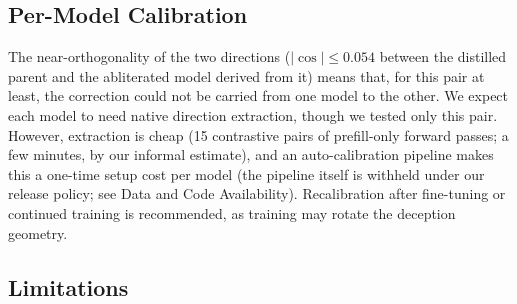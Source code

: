 \documentclass[11pt,letterpaper]{article}
\begin{document}
\subsection{Per-Model Calibration}\label{sec:calibration}

The near-orthogonality of the two directions ($|\cos| \le 0.054$ between the distilled parent and the abliterated model derived from it) means that, for this pair at least, the correction could not be carried from one model to the other. We expect each model to need native direction extraction, though we tested only this pair. However, extraction is cheap (15 contrastive pairs of prefill-only forward passes; a few minutes, by our informal estimate), and an auto-calibration pipeline makes this a one-time setup cost per model (the pipeline itself is withheld under our release policy; see Data and Code Availability). Recalibration after fine-tuning or continued training is recommended, as training may rotate the deception geometry.

\subsection{Limitations}\label{sec:limitations}
\end{document}
